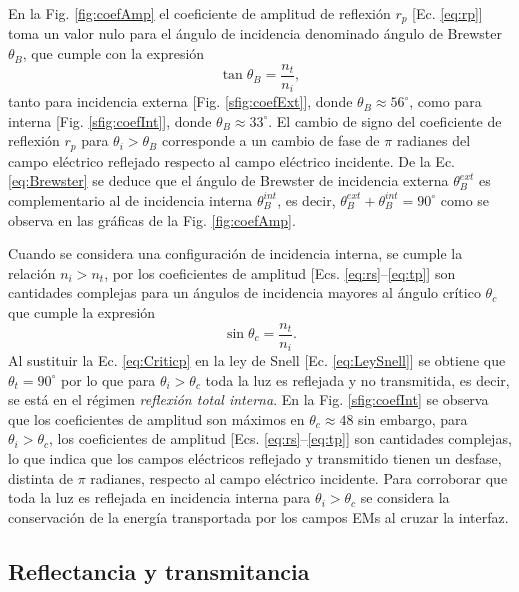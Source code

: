 En la Fig. \ref{fig:coefAmp} el coeficiente de amplitud de reflexión $r_p$ [Ec. \eqref{eq:rp}] toma un valor nulo para el ángulo de incidencia  denominado ángulo de Brewster $\theta_B$, que cumple con la expresión 
%
	\begin{equation}
	\tan\theta_B = \frac{n_t}{n_i},
	\label{eq:Brewster}
	\end{equation}
%	
tanto para incidencia externa [Fig. \ref{sfig:coefExt}], donde $\theta_B \approx 56^\circ$, como para interna [Fig. \ref{sfig:coefInt}], donde $\theta_B \approx 33^\circ$. El cambio de signo del coeficiente de reflexión $r_p$ para $\theta_i>\theta_B$ corresponde a un cambio de fase de $\pi$ radianes del campo eléctrico reflejado respecto al campo eléctrico incidente. De la Ec. \eqref{eq:Brewster} se deduce que el ángulo de Brewster de incidencia externa $\theta_B^{ext}$ es complementario al de incidencia interna $\theta_B^{int}$, es decir, $\theta_B^{ext}+\theta_B^{int} = 90^\circ$ como se observa en las gráficas de la Fig. \ref{fig:coefAmp}. 

Cuando se considera una configuración de incidencia interna, se cumple la relación $n_i>n_t$, por los coeficientes de amplitud  [Ecs. \eqref{eq:rs}--\eqref{eq:tp}] son cantidades complejas para un ángulos de incidencia mayores al ángulo crítico $\theta_c$ que cumple la expresión
% 
	\begin{equation}
	\sin\theta_c = \frac{n_t}{n_i}.
	\label{eq:Criticp}
	\end{equation}
%
Al sustituir la Ec. \eqref{eq:Criticp} en la ley de Snell [Ec. \eqref{eq:LeySnell}] se obtiene que $\theta_t = 90^\circ$ por lo que para $\theta_i>\theta_c$ toda la luz es reflejada y no transmitida, es decir, se está en el régimen \emph{reflexión total interna}. En la Fig. \ref{sfig:coefInt} se observa que los coeficientes de amplitud son máximos en $\theta_c \approx 48$ sin embargo, para $\theta_i>\theta_c$, los coeficientes de amplitud  [Ecs. \eqref{eq:rs}--\eqref{eq:tp}] son cantidades complejas, lo que indica que los campos eléctricos reflejado y transmitido tienen un desfase, distinta de $\pi$ radianes, respecto al campo eléctrico incidente.  Para corroborar que toda la luz es reflejada en incidencia interna para $\theta_i>\theta_c$ se considera la conservación de la energía transportada por los campos EMs al cruzar la interfaz.


	\subsection{Reflectancia y transmitancia}

